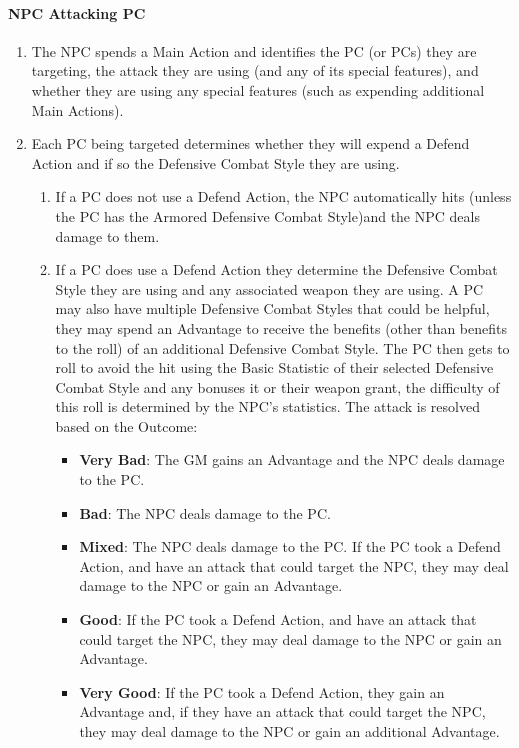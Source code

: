 \paragraph{NPC Attacking PC}
\begin{enumerate}
  \item The NPC spends a Main Action and identifies the PC (or PCs) they are targeting, the attack they are using (and any of its special features), and whether they are using any special features (such as expending additional Main Actions).
  \item Each PC being targeted determines whether they will expend a Defend Action and if so the Defensive Combat Style they are using.
    \begin{enumerate}
      \item If a PC does not use a Defend Action, the NPC automatically hits (unless the PC has the Armored Defensive Combat Style)\footnotemark and the NPC deals damage to them.
      \item If a PC does use a Defend Action they determine the Defensive Combat Style they are using and any associated weapon they are using.
        A PC may also have multiple Defensive Combat Styles that could be helpful, they may spend an Advantage to receive the benefits (other than benefits to the roll) of an additional Defensive Combat Style.
        The PC then gets to roll to avoid the hit using the Basic Statistic of their selected Defensive Combat Style and any bonuses it or their weapon grant, the difficulty of this roll is determined by the NPC's statistics.
        The attack is resolved based on the Outcome:
        \begin{itemize}
          \item \textbf{Very Bad}: The GM gains an Advantage and the NPC deals damage to the PC.
          \item \textbf{Bad}: The NPC deals damage to the PC.
          \item \textbf{Mixed}: The NPC deals damage to the PC. If the PC took a Defend Action, and have an attack that could target the NPC, they may deal damage to the NPC or gain an Advantage.
          \item \textbf{Good}: If the PC took a Defend Action, and have an attack that could target the NPC, they may deal damage to the NPC or gain an Advantage.
          \item \textbf{Very Good}: If the PC took a Defend Action, they gain an Advantage and, if they have an attack that could target the NPC, they may deal damage to the NPC or gain an additional Advantage.
        \end{itemize}
    \end{enumerate}
\end{enumerate}

